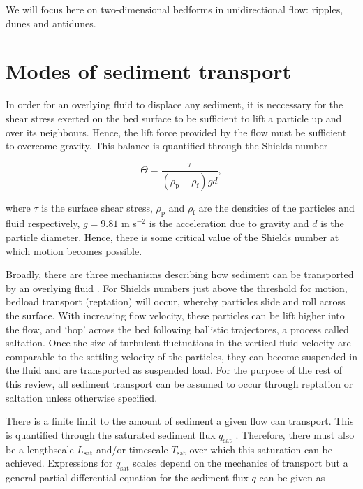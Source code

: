 \documentclass[12pt]{article}
\begin{document}
We will focus here on two-dimensional bedforms in unidirectional flow: ripples, dunes and antidunes. 
\section{Modes of sediment transport}
\label{sec:sed_trans}

In order for an overlying fluid to displace any sediment, it is neccessary for the shear stress exerted on the bed surface to be sufficient to lift a particle up and over its neighbours. Hence, the lift force provided by the flow must be sufficient to overcome gravity. This balance is quantified through the Shields number

\begin{equation}
\label{equ:Shields}
\Theta = \frac{\tau}{(\rho_{\text{p}} - \rho_{\text{f}}) g d},
\end{equation}

where $\tau$ is the surface shear stress, $\rho_{\text{p}}$ and $\rho_{\text{f}}$ are the densities of the particles and fluid respectively, $g = 9.81$ m s$^{-2}$ is the acceleration due to gravity and $d$ is the particle diameter. Hence, there is some critical value of the Shields number at which motion becomes possible.

Broadly, there are three mechanisms describing how sediment can be transported by an overlying fluid \citep{Bagnold41}. For Shields numbers just above the threshold for motion, bedload transport (reptation) will occur, whereby particles slide and roll across the surface. With increasing flow velocity, these particles can be lift higher into the flow, and `hop' across the bed following ballistic trajectores, a process called saltation. Once the size of turbulent fluctuations in the vertical fluid velocity are comparable to the settling velocity of the particles, they can become suspended in the fluid and are transported as suspended load. For the purpose of the rest of this review, all sediment transport can be assumed to occur through reptation or saltation unless otherwise specified. 

There is a finite limit to the amount of sediment a given flow can transport. This is quantified through the saturated sediment flux $q_{\text{sat}}$ \citep{Bagnold41, Owen64}. Therefore, there must also be a lengthscale $L_{\text{sat}}$ and/or timescale $T_{\text{sat}}$ over which this saturation can be achieved. Expressions for $q_{\text{sat}}$ scales depend on the mechanics of transport but a general partial differential equation for the sediment flux $q$ can be given as \citep{Charru13}
\end{document}
